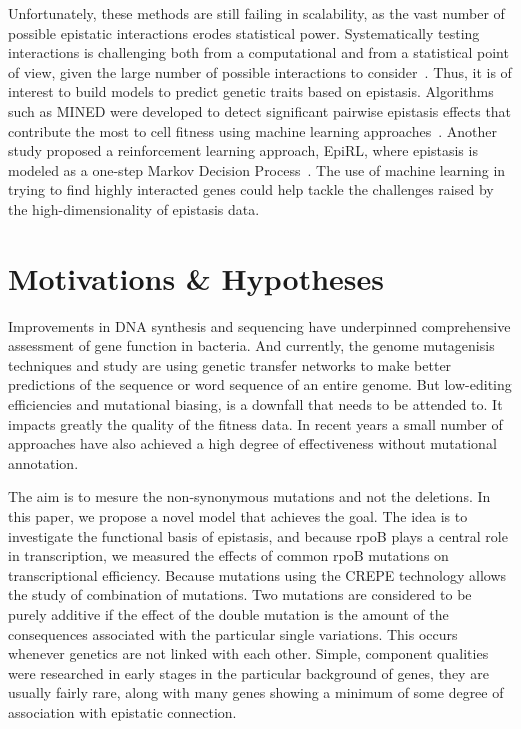 \documentclass[12pt]{article}
\begin{document}
  Unfortunately, these methods are still failing in scalability, as the vast
  number of possible epistatic interactions erodes statistical power.
  Systematically testing interactions is challenging both from a
  computational and from a statistical point of view, given the large number of
  possible interactions to consider~\cite{slim2019novel}. Thus, it is of
  interest to build models to predict genetic traits based on epistasis.
  Algorithms such as MINED were developed to detect significant pairwise
  epistasis effects that contribute the most to cell
  fitness using machine learning approaches~\cite{he2015mined}. Another study
  proposed a reinforcement learning approach, EpiRL, where epistasis is modeled
  as a one-step Markov Decision Process~\cite{huang2019epirl}. The use of
  machine learning in trying to find highly interacted genes could help tackle
  the challenges raised by the high-dimensionality of epistasis data.

  \section*{Motivations \& Hypotheses}

  Improvements in DNA synthesis and sequencing have underpinned comprehensive
  assessment of gene function in bacteria. And currently, the genome
  mutagenisis techniques and study are using genetic transfer networks to make
  better predictions of the sequence or word sequence of an entire genome. But
  low-editing efficiencies and mutational biasing, is a downfall that needs to
  be attended to. It impacts greatly the quality of the fitness data.  In
  recent years a small number of approaches have also achieved a high degree of
  effectiveness without mutational annotation. 

  The aim is to mesure the non-synonymous mutations and not the deletions.  In
  this paper, we propose a novel model that achieves the goal.  The idea is to
  investigate the functional basis of epistasis, and because rpoB plays a
  central role in transcription, we measured the effects of common rpoB
  mutations on transcriptional efficiency. Because mutations using the CREPE
  technology allows the study of combination of mutations. Two mutations are
  considered to be purely additive if the effect of the double mutation is the
  amount of the consequences associated with the particular single variations.
  This occurs whenever genetics are not linked with each other. Simple,
  component qualities were researched in early stages in the particular
  background of genes, they are usually fairly rare, along with many genes
  showing a minimum of some degree of association with epistatic connection.
\end{document}
